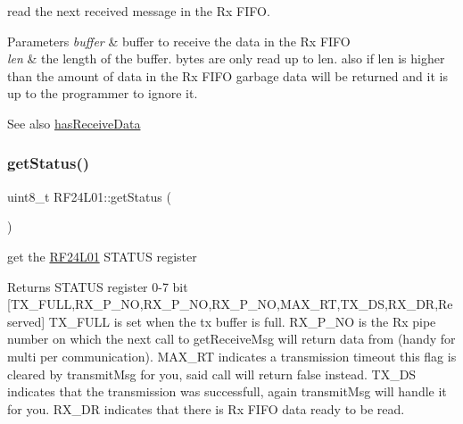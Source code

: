 read the next received message in the Rx F\+I\+FO. 
\begin{DoxyParams}{Parameters}
{\em buffer} & buffer to receive the data in the Rx F\+I\+FO \\
\hline
{\em len} & the length of the buffer. bytes are only read up to len. also if len is higher than the amount of data in the Rx F\+I\+FO garbage data will be returned and it is up to the programmer to ignore it. \\
\hline
\end{DoxyParams}
\begin{DoxySeeAlso}{See also}
\mbox{\hyperlink{namespace_r_f24_l01_ac87aab075d5fd63ba4cd99daa1b34d33}{has\+Receive\+Data}} 
\end{DoxySeeAlso}
\mbox{\label{namespace_r_f24_l01_a37ae626e05545579eee5d81c88601c30}} 
\subsubsection{\texorpdfstring{get\+Status()}{getStatus()}}
{\footnotesize\ttfamily uint8\+\_\+t R\+F24\+L01\+::get\+Status (\begin{DoxyParamCaption}{ }\end{DoxyParamCaption})}

get the \mbox{\hyperlink{namespace_r_f24_l01}{R\+F24\+L01}} S\+T\+A\+T\+US register \begin{DoxyReturn}{Returns}
S\+T\+A\+T\+US register 0-\/7 bit \mbox{[}T\+X\+\_\+\+F\+U\+LL,R\+X\+\_\+\+P\+\_\+\+NO,R\+X\+\_\+\+P\+\_\+\+NO,R\+X\+\_\+\+P\+\_\+\+NO,M\+A\+X\+\_\+\+RT,T\+X\+\_\+\+DS,R\+X\+\_\+\+DR,Reserved\mbox{]} T\+X\+\_\+\+F\+U\+LL is set when the tx buffer is full. R\+X\+\_\+\+P\+\_\+\+NO is the Rx pipe number on which the next call to get\+Receive\+Msg will return data from (handy for multi per communication). M\+A\+X\+\_\+\+RT indicates a transmission timeout this flag is cleared by transmit\+Msg for you, said call will return false instead. T\+X\+\_\+\+DS indicates that the transmission was successfull, again transmit\+Msg will handle it for you. R\+X\+\_\+\+DR indicates that there is Rx F\+I\+FO data ready to be read. 
\end{DoxyReturn}
\mbox{\label{namespace_r_f24_l01_ac87aab075d5fd63ba4cd99daa1b34d33}} 
